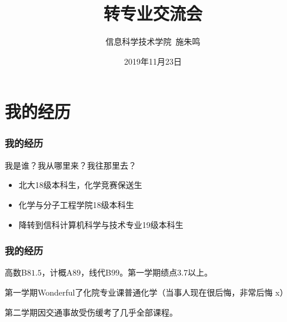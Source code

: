 \documentclass[12pt,AutoFakeBold]{beamer}
\author{信息科学技术学院\ 施朱鸣}
\title{转专业交流会}
\date{2019年11月23日}
\begin{document}
    \frame[plain]{\titlepage}
    \section{我的经历}
    \begin{frame}
        \frametitle{我的经历}
        我是谁？我从哪里来？我往那里去？
        \begin{itemize}
            \item 北大18级本科生，化学竞赛保送生
            \item 化学与分子工程学院18级本科生
            \item 降转到信科计算机科学与技术专业19级本科生
        \end{itemize}
    \end{frame}
    \begin{frame}
        \frametitle{我的经历}
        高数B$81.5$，计概A$89$，线代B$99$。第一学期绩点$3.7$以上。

        第一学期Wonderful了化院专业课普通化学（当事人现在很后悔，非常后悔 x）

        第二学期因交通事故受伤缓考了几乎全部课程。
    \end{frame}
    
\end{document}
